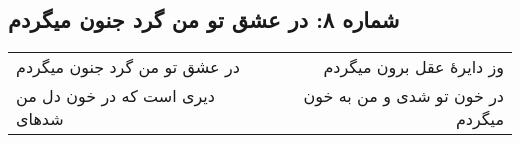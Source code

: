 \begin{center}
\section*{شماره ۸: در عشق تو من گرد جنون میگردم}
\label{sec:008}
\begin{longtable}{l p{0.5cm} r}
در عشق تو من گرد جنون میگردم
&&
وز دایرهٔ عقل برون میگردم
\\
دیری است که در خون دل من شدهای
&&
در خون تو شدی و من به خون میگردم
\\
\end{longtable}
\end{center}
